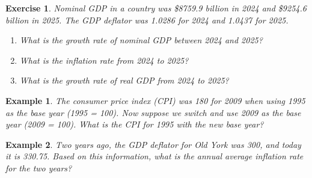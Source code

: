 \documentclass[12pt]{article}
\newtheorem{example}{Example}
\newtheorem{exercise}{Exercise}
\numberwithin{equation}{section}
\begin{document}
\begin{exercise}
    Nominal GDP in a country was \$8759.9 billion in 2024 and \$9254.6 billion in 2025. The GDP deflator was 1.0286 for 2024 and 1.0437 for 2025.
    \begin{enumerate}[label=(\roman*)]
        \item What is the growth rate of nominal GDP between 2024 and 2025?
        \item What is the inflation rate from 2024 to 2025?
        \item What is the growth rate of real GDP from 2024 to 2025?
    \end{enumerate}
\end{exercise}

\begin{example}
    The consumer price index (CPI) was 180 for 2009 when using 1995 as the base year (1995 = 100). Now suppose we switch and use 2009 as the base year (2009 = 100). What is the CPI for 1995 with the new base year?
\end{example}

\vspace{36pt}

\begin{example}
    Two years ago, the GDP deflator for Old York was 300, and today it is 330.75. Based on this information, what is the annual average inflation rate for the two years?
\end{example}
\end{document}
